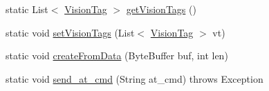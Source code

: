 \begin{DoxyCompactItemize}
\item 
static List$<$ \hyperlink{classworkspace_1_1_a_r_drone_nav_data_1_1src_1_1controller_1_1_vision_tag}{Vision\+Tag} $>$ \hyperlink{classworkspace_1_1_a_r_drone_nav_data_1_1src_1_1_nav_data_a9e7270b492f5d82da834ac9191162a23}{get\+Vision\+Tags} ()
\item 
static void \hyperlink{classworkspace_1_1_a_r_drone_nav_data_1_1src_1_1_nav_data_a636d7e555be5221385f60d6d9635363e}{set\+Vision\+Tags} (List$<$ \hyperlink{classworkspace_1_1_a_r_drone_nav_data_1_1src_1_1controller_1_1_vision_tag}{Vision\+Tag} $>$ vt)
\item 
static void \hyperlink{classworkspace_1_1_a_r_drone_nav_data_1_1src_1_1_nav_data_a48f7de7994b48a30f09910e9971d300d}{create\+From\+Data} (Byte\+Buffer buf, int len)
\item 
static void \hyperlink{classworkspace_1_1_a_r_drone_nav_data_1_1src_1_1_nav_data_a26c1f5059f0673a3a498ea4e382a7588}{send\+\_\+at\+\_\+cmd} (String at\+\_\+cmd)  throws Exception 
\end{DoxyCompactItemize}

